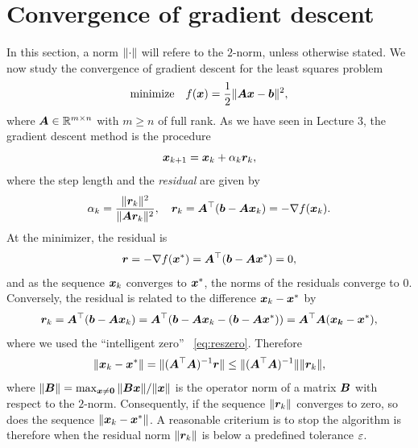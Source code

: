 \section{Convergence of gradient descent}
In this section, a norm $\Vert {\cdot}\Vert$ will refere to the $2$-norm, unless otherwise stated.
We now study the convergence of gradient descent for the least squares problem
\begin{equation}\label{eq:ffromgraddesc}
 \text{minimize}\quad f(\bm{x}) = \frac{1}{2}\Vert {\bm{A}\bm{x}-\bm{b}}\Vert^2,
\end{equation}
where $\bm{A}\in \mathbb{R}^{m\times n}$ with $m\geq n$ of full rank.
As we have seen in Lecture 3, the gradient descent method is the procedure
\begin{equation*}
 \bm{x}_{k+1}=\bm{x}_{k} + \alpha_k\bm{r}_k,
\end{equation*}
where the step length and the {\em residual} are given by
\begin{equation*}
 \alpha_k = \frac{\Vert {\bm{r}_k}\Vert^2}{\Vert {\bm{A}\bm{r}_k}\Vert^2}, \quad \bm{r}_k = \bm{A}^{\top}(\bm{b}-\bm{A}\bm{x}_k)=-\nabla f(\bm{x}_k).
\end{equation*}
At the minimizer, the residual is 
\begin{equation}\label{eq:reszero}
 \bm{r} = -\nabla f(\bm{x}^*)=\bm{A}^{\top}(\bm{b}-\bm{A}\bm{x}^*) = 0,
\end{equation}
and 
as the sequence $\bm{x}_k$ converges to $\bm{x}^*$, the norms of the residuals converge to $0$. Conversely, the residual is related to the difference $\bm{x}_k-\bm{x}^*$ by
\begin{equation}\label{eq:resdif}
 \bm{r}_k = \bm{A}^{\top}(\bm{b}-\bm{A}\bm{x}_k) = \bm{A}^{\top}(\bm{b}-\bm{A}\bm{x}_k-(\bm{b}-\bm{A}\bm{x}^*)) = \bm{A}^{\top}\bm{A}(\bm{x_k}-\bm{x}^*),
\end{equation}
where we used the ``intelligent zero'' ~\eqref{eq:reszero}. Therefore
\begin{equation*}
 \Vert {\bm{x}_k-\bm{x}^*}\Vert = \Vert {(\bm{A}^{\top}\bm{A})^{-1}\bm{r}}\Vert\leq \Vert {(\bm{A}^{\top}\bm{A})^{-1}}\Vert\Vert {\bm{r}_k}\Vert,
\end{equation*}
where $\Vert {\bm{B}}\Vert = \max_{\bm{x}\neq \bm{0}}\Vert {\bm{B}\bm{x}}\Vert/\Vert {\bm{x}}\Vert$ is the operator norm of a matrix $\bm{B}$ with respect to the $2$-norm. Consequently, if the sequence $\Vert {\bm{r}_k}\Vert$ converges to zero, so does the sequence $\Vert {\bm{x}_k-\bm{x}^*}\Vert$. A reasonable criterium is to stop the algorithm is therefore when the residual norm $\Vert {\bm{r}_k}\Vert$ is below a predefined tolerance $\varepsilon$. 

